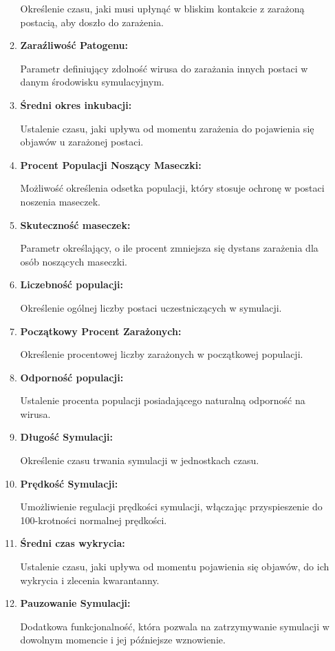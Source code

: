 \begin{itemize}
\begin{enumerate}
		Określenie czasu, jaki musi upłynąć w bliskim kontakcie z zarażoną postacią, aby doszło do zarażenia.
		\item \textbf{Zaraźliwość Patogenu:}
		
		Parametr definiujący zdolność wirusa do zarażania innych postaci w danym środowisku symulacyjnym.
		\item \textbf{Średni okres inkubacji:}
		
		Ustalenie czasu, jaki upływa od momentu zarażenia do pojawienia się objawów u zarażonej postaci.
		\item \textbf{Procent Populacji Noszący Maseczki:}
		
		Możliwość określenia odsetka populacji, który stosuje ochronę w postaci noszenia maseczek.
		\item \textbf{Skuteczność maseczek:}
		
		Parametr określający, o ile procent zmniejsza się dystans zarażenia dla osób noszących maseczki.
		\item \textbf{Liczebność populacji:}
		
		Określenie ogólnej liczby postaci uczestniczących w symulacji.
		
		\item \textbf{Początkowy Procent Zarażonych:}
		
		Określenie procentowej liczby zarażonych w początkowej populacji.
		\item \textbf{Odporność populacji:}
		
		Ustalenie procenta populacji posiadającego naturalną odporność na wirusa.
		\item \textbf{Długość Symulacji:}
		
		Określenie czasu trwania symulacji w jednostkach czasu.
		\item \textbf{Prędkość Symulacji:}
		
		Umożliwienie regulacji prędkości symulacji, włączając przyspieszenie do 100-krotności normalnej prędkości.
		
		\item \textbf{Średni czas wykrycia:}
		
		Ustalenie czasu, jaki upływa od momentu pojawienia się objawów, do ich wykrycia i zlecenia kwarantanny.
		\item \textbf{Pauzowanie Symulacji:}
		
		Dodatkowa funkcjonalność, która pozwala na zatrzymywanie symulacji w dowolnym momencie i jej późniejsze wznowienie.
	\end{enumerate}
\end{itemize}
